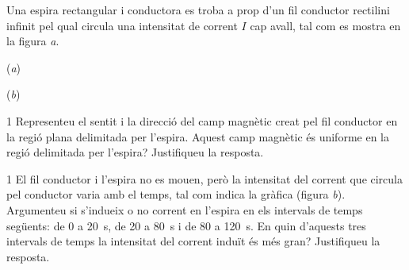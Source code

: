 Una espira rectangular i conductora es troba a prop d'un fil conductor rectilini infinit pel qual circula una intensitat de corrent $I$ cap avall, tal com es mostra en la figura \textit{a}.

\begin{center}
\begin{minipage}[b]{0.3\linewidth}
{\centering (\textit{a})\par}
\end{minipage}\hspace{0.06\linewidth}%
\begin{minipage}[b]{0.48\linewidth}
{\centering (\textit{b})\par}
\end{minipage}
\end{center}

\begin{apartat}{1}
Representeu el sentit i la direcció del camp magnètic creat pel fil conductor en la regió plana delimitada per l'espira. Aquest camp magnètic és uniforme en la regió delimitada per l'espira? Justifiqueu la resposta.
\end{apartat}

\begin{apartat}{1}
El fil conductor i l'espira no es mouen, però la intensitat del corrent que circula pel conductor varia amb el temps, tal com indica la gràfica (figura \textit{b}). Argumenteu si s'indueix o no corrent en l'espira en els intervals de temps següents: de 0 a 20~s, de 20 a 80~s i de 80 a 120~s. En quin d'aquests tres intervals de temps la intensitat del corrent induït és més gran? Justifiqueu la resposta.
\end{apartat}
